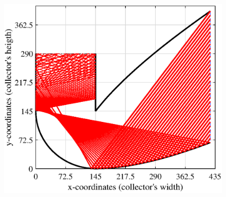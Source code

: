 \begin{figure}[ht!]
	\begin{minipage}{0.48\columnwidth}
		\includegraphics[scale=0.45]{figs/RT2D-hts145.eps}
		

\end{minipage}
\end{figure}
